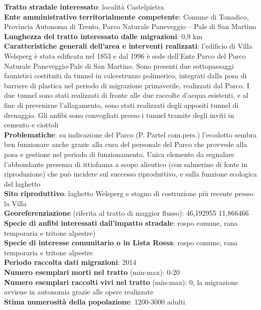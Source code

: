 \documentclass[11pt,a4paper,twoside]{memoir}
\begin{document}
\textbf{Tratto stradale interessato}: località Castelpietra  \\
\textbf{Ente amministrativo territorialmente competente}: Comune di Tonadico, Provincia Autonoma di Trento, Parco Naturale Paneveggio – Pale di San Martino  \\
\textbf{Lunghezza del tratto interessato dalle migrazioni}: 0,9 km \\
\textbf{Caratteristiche generali dell’area e interventi realizzati}: l'edificio di Villa Welsperg è stata edificata nel 1853 e dal 1996 è sede dell'Ente Parco del Parco Naturale Paneveggio-Pale di San Martino. Sono presenti due sottopassaggi faunistici costituiti da tunnel in calcestruzzo polimerico, integrati dalla posa di barriere di plastica nel periodo di migrazione primaverile, realizzati dal Parco. I due tunnel sono stati realizzati di fronte alle due raccolte d'acqua esistenti, e al fine di prevenirne l'allagamento, sono stati realizzati degli appositi tunnel di drenaggio. Gli anfibi sono convogliati presso i tunnel tramite degli inviti in cemento e ciottoli \\
\textbf{Problematiche}: su indicazione del Parco (P. Partel com.pers.) l’ecodotto sembra ben funzionare anche grazie alla cura del personale del Parco che provvede alla posa e gestione nel periodo di funzionamento. Unica elemento da segnalare l’abbondante presenza di ittiofauna a scopo alieutico (con salmerino di fonte in riproduzione) che può incidere sul successo riproduttivo, e sulla funzione ecologica del laghetto \\
\textbf{Sito riproduttivo}: laghetto Welsperg e stagno di costruzione più recente presso la Villa \\
\textbf{Georeferenziazione} (riferita al tratto di maggior flusso): 46,192955 11,866466 \\
\textbf{Specie di anfibi interessati dall’impatto stradale}: rospo comune, rana temporaria e tritone alpestre) \\
\textbf{Specie di interesse comunitario o in Lista Rossa}: rospo comune, rana temporaria e tritone alpestre \\
\textbf{Periodo raccolta dati migrazioni}: 2014 \\
\textbf{Numero esemplari morti nel tratto} (min-max): 0-20  \\
\textbf{Numero esemplari raccolti vivi nel tratto} (min-max): 0, la migrazione avviene in autonomia grazie alle opere realizzate  \\
\textbf{Stima numerosità della popolazione}: 1200-3000 adulti \\
\end{document}
